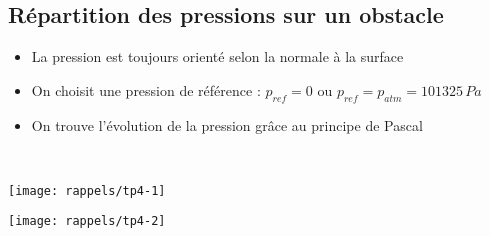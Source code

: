 \subsection*{Répartition des pressions sur un obstacle}
\begin{itemize}
\item La pression est toujours orienté selon la normale à la surface
\item On choisit une pression de référence : $p_{ref} = 0$ ou $p_{ref} = p_{atm} = 101325 \, Pa$
\item On trouve l'évolution de la pression grâce au principe de Pascal
\end{itemize}
\ \\
\begin{minipage}{0.55 \textwidth}
\begin{flushleft}
	\texttt{[image: rappels/tp4-1]}
\end{flushleft}
\end{minipage}
\begin{minipage}{0.5 \textwidth}
\begin{flushleft}
	\texttt{[image: rappels/tp4-2]}
\end{flushleft}
\end{minipage}